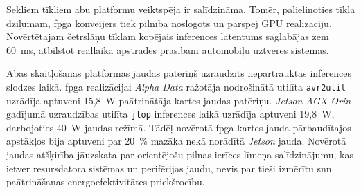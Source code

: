 Sekliem tīkliem abu platformu veiktspēja ir salīdzināma. Tomēr, palielinoties tīkla dziļumam, \Gls{fpga} konveijers tiek pilnībā noslogots un pārspēj GPU realizāciju. Novērtētajam četrslāņu tīklam kopējais inferences latentums saglabājas zem \qty{60}{\milli\second}, atbilstot reāllaika apstrādes prasībām automobiļu uztveres sistēmās.

Abās skaitļošanas platformās jaudas patēriņš uzraudzīts nepārtrauktas inferences slodzes laikā. \Gls{fpga} realizācijai \textit{Alpha Data} ražotāja nodrošinātā utilīta \texttt{avr2util} uzrādīja aptuveni 15,8~W paātrinātāja kartes jaudas patēriņu. \textit{Jetson AGX Orin} gadījumā uzraudzības utilīta \texttt{jtop} inferences laikā uzrādīja aptuveni 19,8~W, darbojoties 40~W jaudas režīmā. Tādēļ novērotā \Gls{fpga} kartes jauda pārbaudītajos apstākļos bija aptuveni par 20~\% mazāka nekā norādītā \textit{Jetson} jauda. Novērotā jaudas atšķirība jāuzskata par orientējošu pilnas ierīces līmeņa salīdzinājumu, kas ietver resursdatora sistēmas un perifērijas jaudu, nevis par tieši izmērītu \Gls{snn} paātrināšanas energoefektivitātes priekšrocību.
